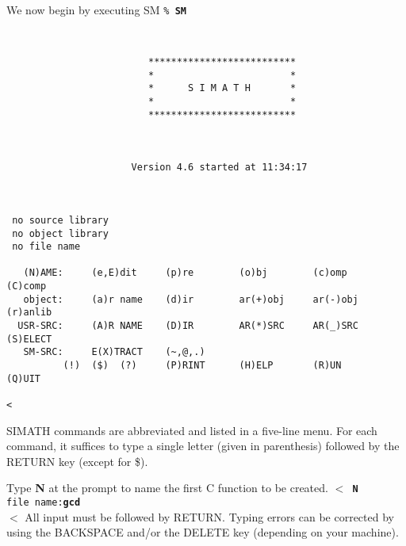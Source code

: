 \newpage

We now begin by executing SM
\leer
{\tt\% {\bf SM} \care} 
\label{SMintro}
\begin{verbatim}


                         **************************           
                         *                        *           
                         *      S I M A T H       *           
                         *                        *           
                         **************************           



                      Version 4.6 started at 11:34:17



 no source library
 no object library
 no file name

   (N)AME:     (e,E)dit     (p)re        (o)bj        (c)omp       (C)comp 
   object:     (a)r name    (d)ir        ar(+)obj     ar(-)obj     (r)anlib
  USR-SRC:     (A)R NAME    (D)IR        AR(*)SRC     AR(_)SRC     (S)ELECT
   SM-SRC:     E(X)TRACT    (~,@,.)                                        
          (!)  ($)  (?)     (P)RINT      (H)ELP       (R)UN        (Q)UIT  

<
\end{verbatim}

\leer
SIMATH commands are abbreviated and listed in a five-line menu.  For each command, it suffices
to type a single letter (given in parenthesis) followed by the RETURN key (except for \$).

Type {\bf N} at the prompt to name the first C function to be created.
\leer
{\tt $<$ {\bf N} \care \\
file name:{\bf gcd} \care\\
$<$}
\leer
All input must be followed by RETURN. Typing errors can be corrected by
using the BACKSPACE and/or the DELETE key (depending on your machine).

\newpage

